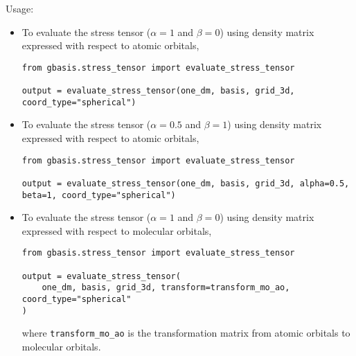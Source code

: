 \documentclass[letterpaper]{article}
\begin{document}
Usage:
\begin{itemize}
\item To evaluate the stress tensor ($\alpha=1$ and $\beta=0$)
  using density matrix expressed with respect to atomic orbitals,
\begin{verbatim}
from gbasis.stress_tensor import evaluate_stress_tensor

output = evaluate_stress_tensor(one_dm, basis, grid_3d, coord_type="spherical")
\end{verbatim}
\item To evaluate the stress tensor ($\alpha=0.5$ and $\beta=1$)
  using density matrix expressed with respect to atomic orbitals,
\begin{verbatim}
from gbasis.stress_tensor import evaluate_stress_tensor

output = evaluate_stress_tensor(one_dm, basis, grid_3d, alpha=0.5, beta=1, coord_type="spherical")
\end{verbatim}
\item To evaluate the stress tensor ($\alpha=1$ and $\beta=0$)
  using density matrix expressed with respect to molecular orbitals,
\begin{verbatim}
from gbasis.stress_tensor import evaluate_stress_tensor

output = evaluate_stress_tensor(
    one_dm, basis, grid_3d, transform=transform_mo_ao, coord_type="spherical"
)
\end{verbatim}
  where
  \verb|transform_mo_ao| is the transformation matrix from atomic orbitals
  to molecular orbitals.
\end{itemize}
\end{document}
